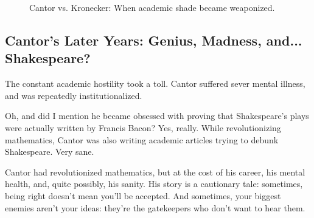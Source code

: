 \begin{figure}[H]
\centering
{}
\caption{Cantor vs. Kronecker: When academic shade became weaponized.}
\end{figure}


\subsection{Cantor’s Later Years: Genius, Madness, and... Shakespeare?}

The constant academic hostility took a toll. Cantor suffered sever mental illness, and was repeatedly institutionalized.

Oh, and did I mention he became obsessed with proving that Shakespeare’s plays were actually written by Francis Bacon? Yes, really. While revolutionizing mathematics, Cantor was also writing academic articles trying to debunk Shakespeare. Very sane. 

Cantor had revolutionized mathematics, but at the cost of his career, his mental health, and, quite possibly, his sanity. His story is a cautionary tale: sometimes, being right doesn’t mean you’ll be accepted. And sometimes, your biggest enemies aren’t your ideas: they’re the gatekeepers who don’t want to hear them.

